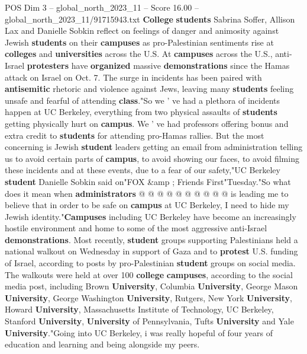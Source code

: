 \begin{textsample}{POS Dim 3 – global\_north\_2023\_11 – Score 16.00 – global\_north\_2023\_11/91715943.txt}  \label{ex:f3_pos_179}
\textbf{College} \textbf{students} Sabrina Soffer, Allison Lax and Danielle Sobkin reflect on feelings of danger and animosity against Jewish \textbf{students} on their \textbf{campuses} as pro-Palestinian sentiments rise at \textbf{colleges} and \textbf{universities} across the U.S.
At \textbf{campuses} across the U.S., anti-Israel \textbf{protesters} have \textbf{organized} massive \textbf{demonstrations} since the Hamas attack on Israel on Oct. 7.
The surge in incidents has been paired with \textbf{antisemitic} rhetoric and violence against Jews, leaving many \textbf{students} feeling unsafe and fearful of attending \textbf{class}."So we ' ve had a plethora of incidents happen at UC Berkeley, everything from two physical assaults of \textbf{students} getting physically hurt on \textbf{campus}.
We ' ve had professors offering bonus and extra credit to \textbf{students} for attending pro-Hamas rallies.
But the most concerning is Jewish \textbf{student} leaders getting an email from administration telling us to avoid certain parts of \textbf{campus}, to avoid showing our faces, to avoid filming these incidents and at these events, due to a fear of our safety,"UC Berkeley \textbf{student} Danielle Sobkin said on"FOX \&amp ; Friends First"Tuesday."So what does it mean when \textbf{administrators} @ @ @ @ @ @ @ @ @ @ is leading me to believe that in order to be safe on \textbf{campus} at UC Berkeley, I need to hide my Jewish identity."\textbf{Campuses} including UC Berkeley have become an increasingly hostile environment and home to some of the most aggressive anti-Israel \textbf{demonstrations}.
Most recently, \textbf{student} groups supporting Palestinians held a national walkout on Wednesday in support of Gaza and to \textbf{protest} U.S. funding of Israel, according to posts by pro-Palestinian \textbf{student} groups on social media.
The walkouts were held at over 100 \textbf{college} \textbf{campuses}, according to the social media post, including Brown \textbf{University}, Columbia \textbf{University}, George Mason \textbf{University}, George Washington \textbf{University}, Rutgers, New York \textbf{University}, Howard \textbf{University}, Massachusetts Institute of Technology, UC Berkeley, Stanford \textbf{University}, \textbf{University} of Pennsylvania, Tufts \textbf{University} and Yale \textbf{University}."Going into UC Berkeley, i was really hopeful of four years of education and learning and being alongside my peers.

\end{textsample}
